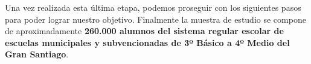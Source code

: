 Una vez realizada esta última etapa, podemos proseguir con los siguientes pasos para poder lograr nuestro objetivo. Finalmente la muestra de estudio se compone de aproximadamente \textbf{260.000 alumnos del sistema regular escolar de escuelas municipales y subvencionadas de 3º Básico a 4º Medio del Gran Santiago}.



